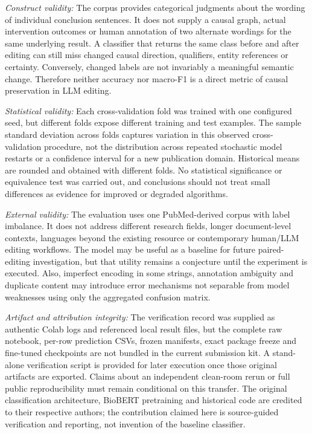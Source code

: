 \documentclass[conference]{IEEEtran}
\begin{document}
\emph{Construct validity:} The corpus provides categorical judgments about the wording of individual conclusion sentences. It does not supply a causal graph, actual intervention outcomes or human annotation of two alternate wordings for the same underlying result. A classifier that returns the same class before and after editing can still miss changed causal direction, qualifiers, entity references or certainty. Conversely, changed labels are not invariably a meaningful semantic change. Therefore neither accuracy nor macro-F1 is a direct metric of causal preservation in LLM editing.

\emph{Statistical validity:} Each cross-validation fold was trained with one configured seed, but different folds expose different training and test examples. The sample standard deviation across folds captures variation in this observed cross-validation procedure, not the distribution across repeated stochastic model restarts or a confidence interval for a new publication domain. Historical means are rounded and obtained with different folds. No statistical significance or equivalence test was carried out, and conclusions should not treat small differences as evidence for improved or degraded algorithms.

\emph{External validity:} The evaluation uses one PubMed-derived corpus with label imbalance. It does not address different research fields, longer document-level contexts, languages beyond the existing resource or contemporary human/LLM editing workflows. The model may be useful as a baseline for future paired-editing investigation, but that utility remains a conjecture until the experiment is executed. Also, imperfect encoding in some strings, annotation ambiguity and duplicate content may introduce error mechanisms not separable from model weaknesses using only the aggregated confusion matrix.

\emph{Artifact and attribution integrity:} The verification record was supplied as authentic Colab logs and referenced local result files, but the complete raw notebook, per-row prediction CSVs, frozen manifests, exact package freeze and fine-tuned checkpoints are not bundled in the current submission kit. A stand-alone verification script is provided for later execution once those original artifacts are exported. Claims about an independent clean-room rerun or full public reproducibility must remain conditional on this transfer. The original classification architecture, BioBERT pretraining and historical code are credited to their respective authors; the contribution claimed here is source-guided verification and reporting, not invention of the baseline classifier.
\end{document}
